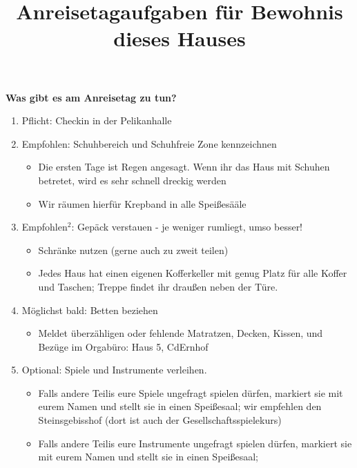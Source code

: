 \documentclass[showtrims, a4paper]{article}
\title{Anreisetagaufgaben für Bewohnis dieses Hauses}
\date{}
\begin{document}
\maketitle{}
\textbf{Was gibt es am Anreisetag zu tun?}
\begin{enumerate}
  \item Pflicht: Checkin in der Pelikanhalle
  \item Empfohlen: Schuhbereich und Schuhfreie Zone kennzeichnen
  \begin{itemize}
    \item Die ersten Tage ist Regen angesagt. Wenn ihr das Haus mit Schuhen betretet, wird es sehr schnell dreckig werden
    \item Wir räumen hierfür Krepband in alle Speißesääle
  \end{itemize}
  \item Empfohlen$^2$: Gepäck verstauen - je weniger rumliegt, umso besser!
  \begin{itemize}
    \item Schränke nutzen (gerne auch zu zweit teilen)
    \item Jedes Haus hat einen eigenen Kofferkeller mit genug Platz für alle Koffer und Taschen;
    Treppe findet ihr draußen neben der Türe.
  \end{itemize}
  \item Möglichst bald: Betten beziehen
  \begin{itemize}
      \item Meldet überzähligen oder fehlende Matratzen, Decken, Kissen, und Bezüge im Orgabüro:
      Haus 5, CdErnhof
  \end{itemize}
  \item Optional: Spiele und Instrumente verleihen.
  \begin{itemize}
   \item Falls andere Teilis eure Spiele ungefragt spielen dürfen,
   markiert sie mit eurem Namen und stellt sie in einen Speißesaal;
   wir empfehlen den Steinsgebisshof (dort ist auch der Gesellschaftsspielekurs)
   \item Falls andere Teilis eure Instrumente ungefragt spielen dürfen,
   markiert sie mit eurem Namen und stellt sie in einen Speißesaal;

\end{itemize}
\end{enumerate}
\end{document}
